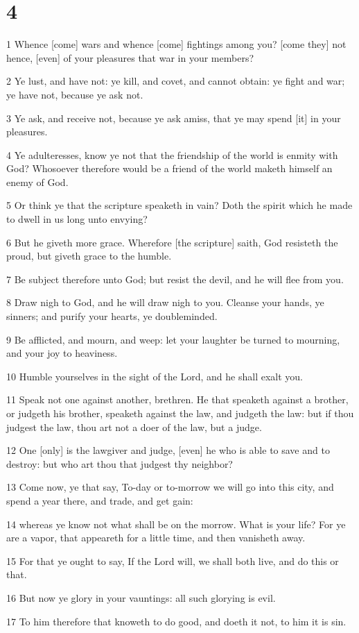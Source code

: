 \chapter{4}

\par 1 Whence [come] wars and whence [come] fightings among you? [come they] not hence, [even] of your pleasures that war in your members?
\par 2 Ye lust, and have not: ye kill, and covet, and cannot obtain: ye fight and war; ye have not, because ye ask not.
\par 3 Ye ask, and receive not, because ye ask amiss, that ye may spend [it] in your pleasures.
\par 4 Ye adulteresses, know ye not that the friendship of the world is enmity with God? Whosoever therefore would be a friend of the world maketh himself an enemy of God.
\par 5 Or think ye that the scripture speaketh in vain? Doth the spirit which he made to dwell in us long unto envying?
\par 6 But he giveth more grace. Wherefore [the scripture] saith, God resisteth the proud, but giveth grace to the humble.
\par 7 Be subject therefore unto God; but resist the devil, and he will flee from you.
\par 8 Draw nigh to God, and he will draw nigh to you. Cleanse your hands, ye sinners; and purify your hearts, ye doubleminded.
\par 9 Be afflicted, and mourn, and weep: let your laughter be turned to mourning, and your joy to heaviness.
\par 10 Humble yourselves in the sight of the Lord, and he shall exalt you.
\par 11 Speak not one against another, brethren. He that speaketh against a brother, or judgeth his brother, speaketh against the law, and judgeth the law: but if thou judgest the law, thou art not a doer of the law, but a judge.
\par 12 One [only] is the lawgiver and judge, [even] he who is able to save and to destroy: but who art thou that judgest thy neighbor?
\par 13 Come now, ye that say, To-day or to-morrow we will go into this city, and spend a year there, and trade, and get gain:
\par 14 whereas ye know not what shall be on the morrow. What is your life? For ye are a vapor, that appeareth for a little time, and then vanisheth away.
\par 15 For that ye ought to say, If the Lord will, we shall both live, and do this or that.
\par 16 But now ye glory in your vauntings: all such glorying is evil.
\par 17 To him therefore that knoweth to do good, and doeth it not, to him it is sin.

